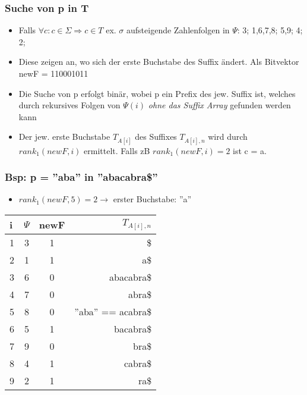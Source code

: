 \documentclass{beamer}
\begin{document}
\begin{frame}
\frametitle{Suche von p in T}
\begin{itemize}
\item Falls $\forall c: c \in \Sigma \Rightarrow c \in T$ ex. $\sigma$ aufsteigende Zahlenfolgen in $\Psi$: 3; 1,6,7,8; 5,9; 4; 2;
\item Diese zeigen an, wo sich der erste Buchstabe des Suffix ändert. Als Bitvektor newF = 110001011
\item Die Suche von p erfolgt binär, wobei p ein Prefix des jew. Suffix ist, welches durch rekursives Folgen von $\Psi(i)$ \textit{ohne das Suffix Array} gefunden werden kann
\item Der jew. erste Buchstabe $T_{A[i]}$ des Suffixes $T_{A[i],n}$ wird durch $rank_1(newF,i)$ ermittelt. Falls zB $rank_1(newF,i) = 2$ ist c = \glqq a\grqq.
\end{itemize}
\end{frame}

\begin{frame}
\frametitle{Bsp: p = ''aba'' in ''abacabra\$''}
\begin{itemize}
\item $rank_1(newF, 5) = 2 \rightarrow$ erster Buchstabe: ''a''
\end{itemize}
\begin{tabular}{l<{\ttfamily}|c<{\ttfamily}c<{\ttfamily} r<{\ttfamily}}
i & $\Psi$ & newF & $T_{A[i],n}$ \\\hline
1 & 3 & 1 &\$\\
2 & 1 & 1 &a\$\\
3 & 6 & 0 &abacabra\$\\
4 & 7 & 0 &abra\$\\
5 & 8 & 0 & ''\color{red}a\color{gray}ba\color{black}'' == \color{red}a\color{gray}cabra\$\\
6 & 5 & 1 &bacabra\$\\
7 & 9 & 0 &bra\$\\
8 & 4 & 1 &cabra\$\\
9 & 2 & 1 &ra\$\\
\end{tabular}
\end{frame}
\end{document}
